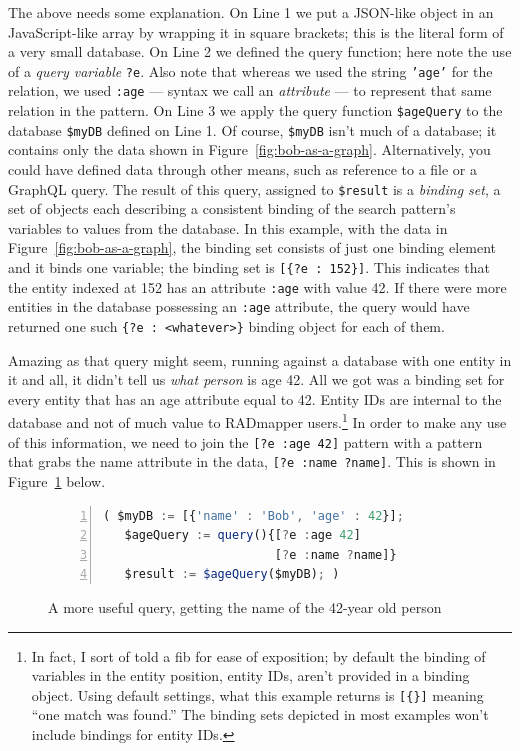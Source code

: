 \documentclass[10pt,letterpaper]{article} %
\newcommand{\stt}[1]{\texttt{#1}} %
\begin{document}
The above needs some explanation.
On Line 1 we put a JSON-like object in an JavaScript-like array by wrapping it in square brackets; this is the literal form of a very small database.
On Line 2 we defined the query function; here note the use of a \textit{query variable} \stt{?e}.
Also note that whereas we used the string \stt{'age'} for the relation, we used \stt{:age} --- syntax we call an \textit{attribute} --- to represent that same relation in the pattern.
On Line 3 we apply the query function \stt{\$ageQuery} to the database \stt{\$myDB} defined on Line 1.
Of course, \stt{\$myDB} isn't much of a database; it contains only the data shown in Figure~\ref{fig:bob-as-a-graph}.
Alternatively, you could have defined data through other means, such as reference to a file or a GraphQL query.
The result of this query, assigned to \stt{\$result} is a \textit{binding set}, a set of objects each describing a consistent binding of the search pattern's variables to values from the database.
In this example, with the data in Figure~\ref{fig:bob-as-a-graph}, the binding set consists of just one binding element and it binds one variable; the binding set is \stt{[\{?e : 152\}]}.
This indicates that the entity indexed at 152 has an attribute \stt{:age} with value 42.
If there were more entities in the database possessing an \stt{:age} attribute, the query would have returned one such \stt{\{?e : <whatever>\}}
binding object for each of them.

Amazing as that query might seem, running against a database with one entity in it and all, it didn't tell us \textit{what person} is age 42.
All we got was a binding set for every entity that has an age attribute equal to 42.
Entity IDs are internal to the database and not of much value to RADmapper users.\footnote{In fact, I sort of told a fib for ease of exposition; by default the binding of variables in the entity position, entity IDs, aren't provided in a binding object.
  Using default settings, what this example returns is \stt{[\{\}]} meaning ``one match was found.''
The binding sets depicted in most examples won't include bindings for entity IDs.}
In order to make any use of this information, we need to join the \stt{[?e :age 42]} pattern with a pattern that grabs the name attribute in the data, \stt{[?e :name ?name]}.
This is shown in Figure~\ref{code:bob-age-more} below.

\begin{figure}[H]
    \caption{A more useful query, getting the name of the 42-year old person}
    \label{code:bob-age-more}
\begin{lstlisting}[language=JavaScript,numberstyle=\scriptsize,basicstyle=\ttfamily\scriptsize,numbers=left,stepnumber=1,breaklines=true]
 ( $myDB := [{'name' : 'Bob', 'age' : 42}];
   $ageQuery := query(){[?e :age 42]
                        [?e :name ?name]}
   $result := $ageQuery($myDB); )
\end{lstlisting}
\end{figure} \vspace{-2em}
\end{document}
